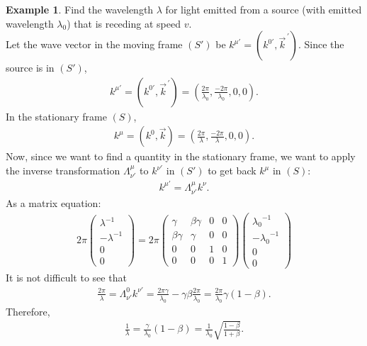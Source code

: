 \documentclass{article}
\theoremstyle{definition}
\newtheorem{exmp}{Example}[section]
\begin{document}
\begin{exmp}
	Find the wavelength $\lambda$ for light emitted from a source (with emitted wavelength $\lambda_0$) that is receding at speed $v$.\\
	
	Let the wave vector in the moving frame $(S')$ be $k^{\mu'} = \left(k^{0'}, \vec{k}^{\,'} \right) $. Since the source is in $(S')$, 
	\begin{align*}
	k^{\mu'} = \left(k^{0'}, \vec{k}^{\,'} \right) = \left( \frac{2\pi}{\lambda_0}, \frac{-2\pi}{\lambda_0},0,0 \right).
	\end{align*}
	In the stationary frame $(S)$, 
	\begin{align*}
	k^\mu = \left( k^0, \vec{k} \right) =  \left( \frac{2\pi}{\lambda}, \frac{-2\pi}{\lambda},0,0 \right).
	\end{align*} 	
	Now, since we want to find a quantity in the stationary frame, we want to apply the inverse transformation $\Lambda^{\mu}_{\nu'}$ to $k^{\nu'}$ in $(S')$ to get back $k^\mu$ in $(S)$:
	\begin{align*}
	k^{\mu'} = \Lambda^{\mu}_{\nu'} k^\nu.
	\end{align*}
	As a matrix equation:
	\begin{align*}
	2\pi\begin{pmatrix}
	\lambda^{-1}\\ -\lambda^{-1}\\0\\0
	\end{pmatrix}
	=
	2\pi\begin{pmatrix}
	\gamma & \beta\gamma & 0 & 0\\
	\beta\gamma & \gamma & 0 & 0\\
	0 & 0 & 1 & 0\\
	0 & 0 & 0 & 1
	\end{pmatrix}
	\begin{pmatrix}
	{\lambda_0}^{-1}\\ -{\lambda_0}^{-1}\\0\\0
	\end{pmatrix}
	\end{align*}
	It is not difficult to see that
	\begin{align*}
	\frac{2\pi}{\lambda} = \Lambda^0_{\nu'}k^{\nu'} = \frac{2\pi\gamma}{\lambda_0} - \gamma\beta\frac{2\pi}{\lambda_0} = \frac{2\pi}{\lambda_0}\gamma(1-\beta).
	\end{align*}
	Therefore,
	\begin{align*}
	\frac{1}{\lambda} = \frac{\gamma}{\lambda_0}(1-\beta) = \frac{1}{\lambda_0}\sqrt{\frac{1-\beta}{1+\beta}}.

\end{align*}
\end{exmp}
\end{document}
